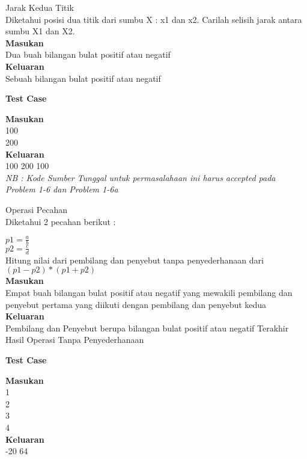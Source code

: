 \newpage
\begin{permasalahan}{Jarak Kedua Titik}\\
\label{prob:Jarak}
Diketahui posisi dua titik dari sumbu X : x1 dan x2. Carilah selisih jarak antara sumbu X1 dan X2.	\\
	\textbf{Masukan}\\
	Dua buah bilangan bulat positif atau negatif \\
	\textbf{Keluaran}\\
	Sebuah bilangan bulat positif atau negatif\\
 	\begin{center}
	\textbf{Test Case}\\
	\end{center}
	\textbf{Masukan}\\
	100\\
	200\\
	\textbf{Keluaran}\\
	100 200 100\\
	
\textit{NB : Kode Sumber Tunggal untuk permasalahaan ini harus accepted pada Problem 1-6 dan Problem 1-6a}
\end{permasalahan}


\newpage
\begin{permasalahan}{Operasi Pecahan}\\
\label{prob:Pecahan}
Diketahui 2 pecahan berikut : 
	
		 $p1 = \frac{a}{b}$ \\
		 $p2 = \frac{c}{d}$ \\
	
Hitung nilai dari pembilang dan penyebut tanpa penyederhanaan dari $(p1-p2)*(p1+p2)$  \\
	\textbf{Masukan}\\
	Empat buah bilangan bulat positif atau negatif yang mewakili pembilang dan penyebut pertama yang diikuti dengan pembilang dan penyebut kedua\\
	\textbf{Keluaran}\\
	Pembilang dan Penyebut berupa bilangan bulat positif atau negatif Terakhir Hasil Operasi Tanpa Penyederhanaan \\
 	\begin{center}
	\textbf{Test Case}\\
	\end{center}
	\textbf{Masukan}\\
	1\\
	2\\
	3\\
	4\\
	\textbf{Keluaran}\\
	-20 64\\
\end{permasalahan}

